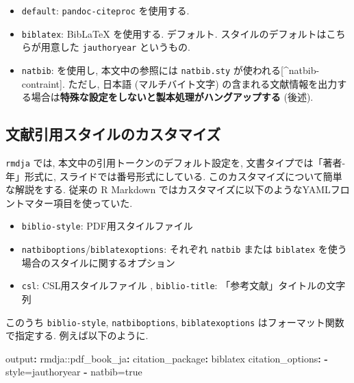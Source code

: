 \documentclass[
  xelatex,ja=standard,jafont=noto]{bxjsbook}
\newenvironment{Shaded}{\begin{snugshade}}{\end{snugshade}}
\newcommand{\AttributeTok}[1]{\textcolor[rgb]{0.77,0.63,0.00}{#1}}
\newcommand{\FunctionTok}[1]{\textcolor[rgb]{0.00,0.00,0.00}{#1}}
\newcommand{\KeywordTok}[1]{\textcolor[rgb]{0.13,0.29,0.53}{\textbf{#1}}}
\providecommand{\tightlist}{%
  \setlength{\itemsep}{0pt}\setlength{\parskip}{0pt}}
\theoremstyle{definition}
\theoremstyle{definition}
\theoremstyle{definition}
\theoremstyle{definition}
\theoremstyle{remark}
\begin{document}
\begin{itemize}
\tightlist
\item
  \texttt{default}: \texttt{pandoc-citeproc} を使用する.
\item
  \texttt{biblatex}: BibLaTeX を使用する. デフォルト.
  スタイルのデフォルトはこちらが用意した \texttt{jauthoryear}
  というもの.
\item
  \texttt{natbib}: \BibTeX を使用し, 本文中の参照には
  \texttt{natbib.sty} が使われる{[}\^{}natbib-contraint{]}. ただし,
  日本語 (マルチバイト文字)
  の含まれる文献情報を出力する場合は\textbf{特殊な設定をしないと製本処理がハングアップする}
  (後述).
\end{itemize}

\hypertarget{ux6587ux732eux5f15ux7528ux30b9ux30bfux30a4ux30ebux306eux30abux30b9ux30bfux30deux30a4ux30ba}{%
\subsection{文献引用スタイルのカスタマイズ}\label{ux6587ux732eux5f15ux7528ux30b9ux30bfux30a4ux30ebux306eux30abux30b9ux30bfux30deux30a4ux30ba}}

\texttt{rmdja} では, 本文中の引用トークンのデフォルト設定を,
文書タイプでは「著者-年」形式に, スライドでは番号形式にしている.
このカスタマイズについて簡単な解説をする. 従来の R Markdown
ではカスタマイズに以下のようなYAMLフロントマター項目を使っていた.

\begin{itemize}
\tightlist
\item
  \texttt{biblio-style}: PDF用スタイルファイル
\item
  \texttt{natbiboptions}/\texttt{biblatexoptions}: それぞれ
  \texttt{natbib} または \texttt{biblatex}
  を使う場合のスタイルに関するオプション
\item
  \texttt{csl}: CSL用スタイルファイル , \texttt{biblio-title}:
  「参考文献」タイトルの文字列
\end{itemize}

このうち \texttt{biblio-style}, \texttt{natbiboptions},
\texttt{biblatexoptions} はフォーマット関数で指定する.
例えば以下のように.

\begin{Shaded}
\begin{Highlighting}[]
\FunctionTok{output}\KeywordTok{:}
\AttributeTok{  rmdja:}\FunctionTok{:pdf\_book\_ja}\KeywordTok{:}
\AttributeTok{    }\FunctionTok{citation\_package}\KeywordTok{:}\AttributeTok{ biblatex}
\AttributeTok{    }\FunctionTok{citation\_options}\KeywordTok{:}
\AttributeTok{      }\KeywordTok{{-}}\AttributeTok{ style=jauthoryear}
\AttributeTok{      }\KeywordTok{{-}}\AttributeTok{ natbib=true}
\end{Highlighting}
\end{Shaded}
\end{document}
